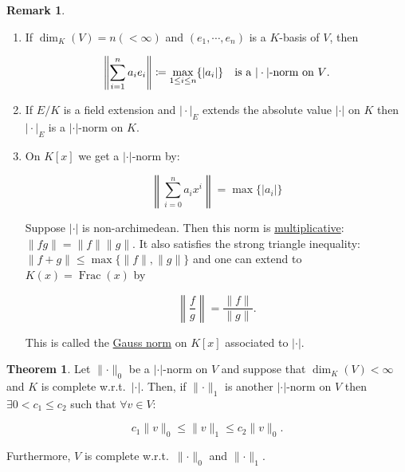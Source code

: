 \documentclass[openany]{amsbook}
\numberwithin{section}{chapter}
\theoremstyle{definition}
\newtheorem*{remark}{Remark}
\newtheorem{theorem}{Theorem}[chapter]
\newcommand{\Frac}{\operatorname{Frac}}
\begin{document}
\begin{remark}
    \begin{enumerate}[label=\arabic*)]
        \item If \(\dim_K(V) = n (< \infty)\) and \((e_1, \cdots , e_n)\) is a \(K\)-basis of \(V\), then
        
        \[
            \left\lVert \sum_{i=1}^n a_i e_i \right\rVert \coloneqq \max_{1 \leq i \leq n} \{ \vert a_i \vert  \} \quad \text{is a \( \vert \cdot \vert \)-norm on \(V\).} 
        \]

        \item If \(E / K\) is a field extension and \(\vert \cdot \vert _E\) extends the absolute value \(\vert \cdot \vert\) on \(K\) then \(\vert \cdot \vert _E\) is a \(\vert \cdot \vert\)-norm on \(K\).
        \item On \(K[x]\) we get a \(\vert \cdot \vert\)-norm by:
        
        \[
            \left\lVert \sum_{i=0}^{n} a_i x^i \right\rVert = \max \{ \vert a_i \vert  \} 
        \]

        Suppose \(\vert \cdot \vert\) is non-archimedean. Then this norm is \underline{multiplicative}: \(\lVert fg \rVert = \lVert f \rVert \lVert g \rVert\). It also satisfies the strong triangle inequality: \(\lVert f + g \rVert \leq \max \{ \lVert f \rVert , \lVert g \rVert  \}\) and one can extend to \(K(x) = \Frac(x)\) by

        \[
            \left\lVert \frac{f}{g} \right\rVert = \frac{\lVert f \rVert }{\lVert g \rVert}.
        \]

        This is called the \underline{Gauss norm} on \(K[x]\) associated to \(\vert \cdot \vert\).

    \end{enumerate} 
\end{remark}

\begin{theorem}
    Let \(\lVert \cdot \rVert _0\) be a \(\vert \cdot \vert \)-norm on \(V\) and suppose that \(\dim_K(V) < \infty\) and \(K\) is complete w.r.t.\ \(\vert \cdot \vert\). Then, if \(\lVert \cdot \rVert _1\) is another \(\vert \cdot \vert\)-norm on \(V\) then \(\exists 0 < c_1 \leq c_2\) such that \(\forall v\in V\):

    \[
        c_1 \lVert v \rVert _0 \leq \lVert v \rVert _1 \leq c_2 \lVert v \rVert _0.
    \]

    Furthermore, \(V\) is complete w.r.t.\ \(\lVert \cdot \rVert _0\) and \(\lVert \cdot \rVert _1\).

\end{theorem}
\end{document}
